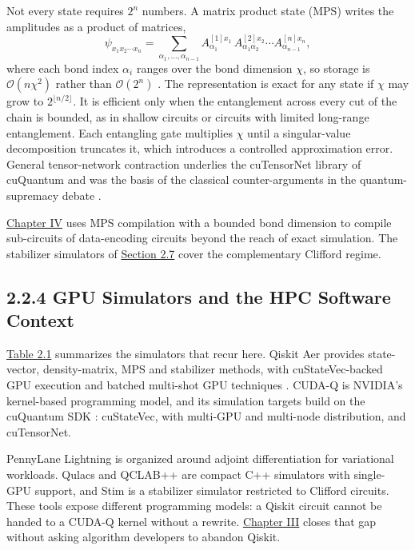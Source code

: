 \documentclass{report}
\theoremstyle{plain}
\theoremstyle{definition}
\theoremstyle{remark}
\newcommand{\bigO}[1]{\mathcal{O}\!\left(#1\right)}
\begin{document}
Not every state requires $2^n$ numbers. A matrix product state (MPS) writes the amplitudes as a product of matrices,
\hypertarget{eq:bg:mps}{}\[
\psi_{x_1x_2\cdots x_n}=\sum_{\alpha_1,\dots,\alpha_{n-1}}A^{[1]x_1}_{\alpha_1}\,A^{[2]x_2}_{\alpha_1\alpha_2}\cdots A^{[n]x_n}_{\alpha_{n-1}},
\tag{2.4}\]
where each bond index $\alpha_i$ ranges over the bond dimension $\chi$, so storage is $\bigO{n\chi^2}$ rather than $\bigO{2^n}$ \cite{perezgarcia2006mps}. The representation is exact for any state if $\chi$ may grow to $2^{\lfloor n/2\rfloor}$. It is efficient only when the entanglement across every cut of the chain is bounded, as in shallow circuits or circuits with limited long-range entanglement. Each entangling gate multiplies $\chi$ until a singular-value decomposition truncates it, which introduces a controlled approximation error. General tensor-network contraction underlies the cuTensorNet library of cuQuantum \cite{bayraktar2023cuquantum} and was the basis of the classical counter-arguments in the quantum-supremacy debate \cite{arute2019supremacy}.

\hyperref[ch:qml]{Chapter IV} uses MPS compilation with a bounded bond dimension to compile sub-circuits of data-encoding circuits beyond the reach of exact simulation. The stabilizer simulators of \hyperref[sec:bg:qec]{Section 2.7} cover the complementary Clifford regime.

\subsection{2.2.4 GPU Simulators and the HPC Software Context}

\hyperref[tab:bg:simulators]{Table 2.1} summarizes the simulators that recur here. Qiskit Aer \cite{javadiabhari2024qiskit} provides state-vector, density-matrix, MPS and stabilizer methods, with cuStateVec-backed GPU execution and batched multi-shot GPU techniques \cite{doi2023multishotgpu}. CUDA-Q \cite{kim2023cudaquantum} is NVIDIA's kernel-based programming model, and its simulation targets build on the cuQuantum SDK \cite{bayraktar2023cuquantum}: cuStateVec, with multi-GPU and multi-node distribution, and cuTensorNet.

PennyLane Lightning \cite{asadi2024pennylanelightning} is organized around adjoint differentiation for variational workloads. Qulacs \cite{suzuki2021qulacs} and QCLAB++ \cite{vanbeeumen2023qclabpp} are compact C++ simulators with single-GPU support, and Stim \cite{gidney2021stim} is a stabilizer simulator restricted to Clifford circuits. These tools expose different programming models: a Qiskit circuit cannot be handed to a CUDA-Q kernel without a rewrite. \hyperref[ch:qgear]{Chapter III} closes that gap without asking algorithm developers to abandon Qiskit.
\end{document}
